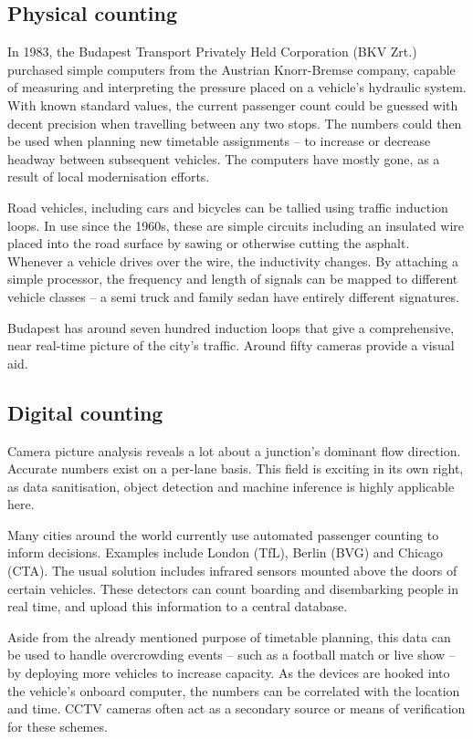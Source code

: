 \subsection{Physical counting}

In 1983, the Budapest Transport Privately Held Corporation (BKV Zrt.) purchased simple computers from the Austrian Knorr-Bremse company, capable of measuring and interpreting the pressure placed on a vehicle's hydraulic system.\cite{ik260_article} With known standard values, the current passenger count could be guessed with decent precision when travelling between any two stops. The numbers could then be used when planning new timetable assignments -- to increase or decrease headway between subsequent vehicles. The computers have mostly gone, as a result of local modernisation efforts.

Road vehicles, including cars and bicycles can be tallied using traffic induction loops.\cite{fhwaLoop} In use since the 1960s, these are simple circuits including an insulated wire placed into the road surface by sawing or otherwise cutting the asphalt. Whenever a vehicle drives over the wire, the inductivity changes. By attaching a simple processor, the frequency and length of signals can be mapped to different vehicle classes -- a semi truck and family sedan have entirely different signatures.

Budapest has around seven hundred induction loops that give a comprehensive, near real-time picture of the city's traffic. Around fifty cameras provide a visual aid.\cite{BkkDataCollection}

\subsection{Digital counting}
Camera picture analysis reveals a lot about a junction's dominant flow direction. Accurate numbers exist on a per-lane basis. This field is exciting in its own right, as data sanitisation, object detection and machine inference is highly applicable here.

Many cities around the world currently use automated passenger counting to inform decisions. Examples include London (TfL), Berlin (BVG) and Chicago (CTA). The usual solution includes infrared sensors mounted above the doors of certain vehicles. These detectors can count boarding and disembarking people in real time, and upload this information to a central database.

Aside from the already mentioned purpose of timetable planning, this data can be used to handle overcrowding events -- such as a football match or live show -- by deploying more vehicles to increase capacity. As the devices are hooked into the vehicle's onboard computer, the numbers can be correlated with the location and time. CCTV cameras often act as a secondary source or means of verification for these schemes.

